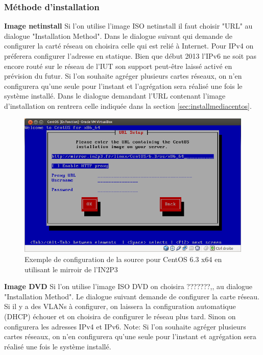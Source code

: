 \documentclass[a4paper,oneside]{report}
\begin{document}
\subsubsection{Méthode d'installation}
\textbf{Image netinstall}\newline
Si l'on utilise l'image ISO netinstall il faut choisir "URL" au dialogue "Installation Method".\newline
Dans le dialogue suivant qui demande de configurer la carté réseau on choisira celle qui est relié à Internet.
Pour IPv4 on préferera configurer l'adresse en statique.
Bien que début 2013 l'IPv6 ne soit pas encore routé sur le réseau de l'IUT son support peut-être laissé activé en prévision du futur.\newline
Si l'on souhaite agréger plusieurs cartes réseaux, on n'en configurera qu'une seule pour l'instant et l’agrégation sera réalisé une fois le système installé.\newline
Dans le dialogue demandant l'URL contenant l'image d'installation on rentrera celle indiquée dans la section \ref{sec:installmediacentos}.\newline
\begin{figure}[!h]
\centering
\includegraphics[resolution=110]{images/config_in2p3.png}
\caption{Exemple de configuration de la source pour CentOS 6.3 x64 en utilisant le mirroir de l'IN2P3}
\end{figure}

\textbf{Image DVD}\newline
Si l'on utilise l'image ISO DVD on choisira ???????,, au dialogue "Installation Method".\newline
Le dialogue suivant demande de configurer la carte réseau.
Si il y a des VLANs à configurer, on laissera la configuration automatique (DHCP) échouer et on choisira de configurer le réseau plus tard.
Sinon on configurera les adresses IPv4 et IPv6.\newline
Note: Si l'on souhaite agréger plusieurs cartes réseaux, on n'en configurera qu'une seule pour l'instant et agrégation sera réalisé une fois le système installé.\newline
\end{document}
